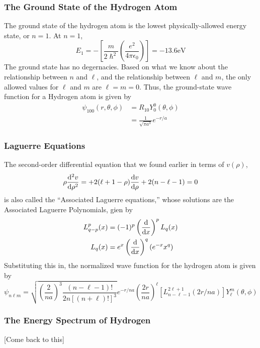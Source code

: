 \documentclass[a4paper]{article}
\begin{document}
\subsubsection{The Ground State of the Hydrogen Atom}
The ground state of the hydrogen atom is the lowest physically-allowed energy
state, or $n=1$. At $n=1$,
\[ E_1 = -\left[\frac{m}{2\hslash^2}\left(\frac{e^2}{4\pi\epsilon_0}\right)
\right] = -13.6 \mathrm{eV} \]
The ground state has no degernacies. Based on what we know about the
relationship between $n$ and $\ell$, and the relationship between $\ell$ and
$m$, the only allowed values for $\ell$ and $m$ are $\ell=m=0$. Thus, the
ground-state wave function for a Hydrogen atom is given by
\begin{align*}
	\psi_{100}(r,\theta,\phi) &= R_{10}Y_0^0(\theta,\phi)\\
				  &= \frac{1}{\sqrt{\pi a^3}}e^{-r/a}
\end{align*}

\subsubsection{Laguerre Equations}
The second-order differential equation that we found earlier in terms of
$v(\rho)$,
\[ \rho\frac{\mathrm{d} ^2v}{\mathrm{d} \rho^2} = +2(\ell+1-\rho)\frac{\mathrm{d} v}{\mathrm{d} \rho}+2(n-\ell-1)=0 \]
is also called the ``Associated Laguerre equations,'' whose solutions are the
Associated Laguerre Polynomials, gien by
\begin{align*}
	L_{q-p}^p(x) &= (-1)^p\left(\frac{\mathrm{d}}{\mathrm{d} x}\right)^p L_q(x)\\
	L_{q}(x) &= e^x\left(\frac{\mathrm{d}}{\mathrm{d} x}\right)^q(e^{-x}x^q)
\end{align*}
Substituting this in, the normalized wave function for the hydrogen atom is
given by
\[ \psi_{n\ell m} =
	\sqrt{\left(\frac{2}{na}\right)^3\frac{(n-\ell-1)!}{2n[(n+\ell)!]^3}}
	e^{-r/na}\left(\frac{2r}{na}\right)^\ell
		\left[L_{n-\ell-1}^{2\ell+1}(2r/na)\right] Y_\ell^m(\theta,\phi)
\]

\subsubsection{The Energy Spectrum of Hydrogen}
[Come back to this]
\end{document}
